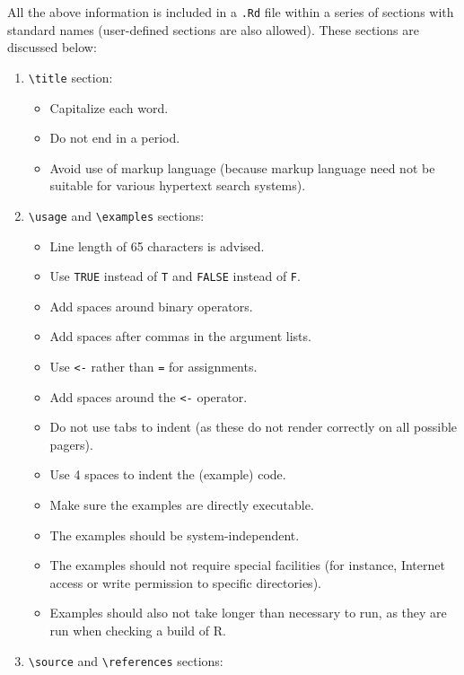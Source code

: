\documentclass[
]{book}
\providecommand{\tightlist}{%
  \setlength{\itemsep}{0pt}\setlength{\parskip}{0pt}}
\begin{document}
All the above information is included in a \texttt{.Rd} file within a series of sections with standard names (user-defined sections are also allowed). These sections are discussed below:

\begin{enumerate}
\def\labelenumi{\arabic{enumi}.}
\tightlist
\item
  \texttt{\textbackslash{}title} section:

  \begin{itemize}
  \tightlist
  \item
    Capitalize each word.
  \item
    Do not end in a period.
  \item
    Avoid use of markup language (because markup language need not be suitable for various hypertext search systems).
  \end{itemize}
\item
  \texttt{\textbackslash{}usage} and \texttt{\textbackslash{}examples} sections:

  \begin{itemize}
  \tightlist
  \item
    Line length of 65 characters is advised.
  \item
    Use \texttt{TRUE} instead of \texttt{T} and \texttt{FALSE} instead of \texttt{F}.
  \item
    Add spaces around binary operators.
  \item
    Add spaces after commas in the argument lists.
  \item
    Use \texttt{\textless{}-} rather than \texttt{=} for assignments.
  \item
    Add spaces around the \texttt{\textless{}-} operator.
  \item
    Do not use tabs to indent (as these do not render correctly on all possible pagers).
  \item
    Use 4 spaces to indent the (example) code.
  \item
    Make sure the examples are directly executable.
  \item
    The examples should be system-independent.
  \item
    The examples should not require special facilities (for instance, Internet access or write permission to specific directories).
  \item
    Examples should also not take longer than necessary to run, as they are run when checking a build of R.
  \end{itemize}
\item
  \texttt{\textbackslash{}source} and \texttt{\textbackslash{}references} sections:


\end{enumerate}
\end{document}
